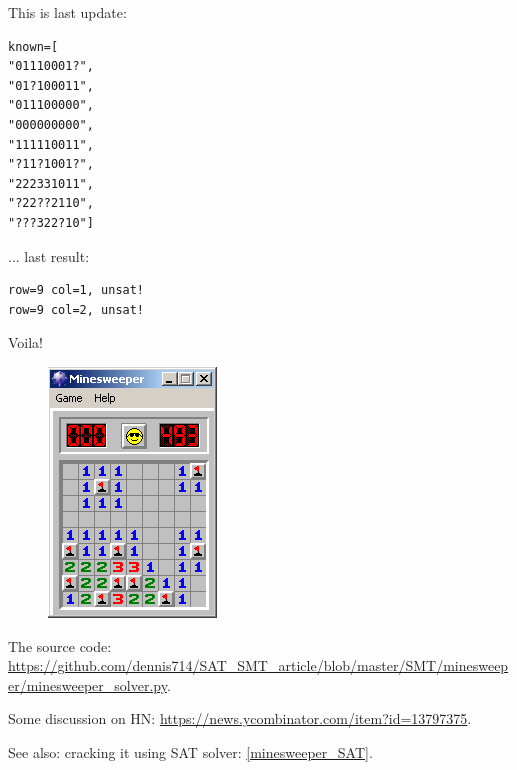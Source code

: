 This is last update:

\begin{lstlisting}
known=[
"01110001?",
"01?100011",
"011100000",
"000000000",
"111110011",
"?11?1001?",
"222331011",
"?22??2110",
"???322?10"]
\end{lstlisting}

... last result:

\begin{lstlisting}
row=9 col=1, unsat!
row=9 col=2, unsat!
\end{lstlisting}

Voila!

\begin{figure}[H]
\centering
\includegraphics[scale=0.75]{SMT/minesweeper/5.png}
\end{figure}

The source code: \url{https://github.com/dennis714/SAT_SMT_article/blob/master/SMT/minesweeper/minesweeper_solver.py}.

Some discussion on HN: \url{https://news.ycombinator.com/item?id=13797375}.

See also: cracking it using SAT solver: \ref{minesweeper_SAT}.

